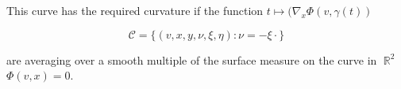\documentclass{article}
\theoremstyle{plain}
\theoremstyle{remark}
\theoremstyle{definition}
\DeclareMathOperator{\RR}{\mathbb{R}}
\begin{document}
This curve has the required curvature if the function $t \mapsto ( \nabla_x \Phi(v,\gamma(t))  $


%
%
%
%
%
%





%
% 
\[ \mathcal{C} = \Big\{ (v,x,y,\nu,\xi,\eta) : \nu = - \xi \cdot  \Big\} \]

are averaging over a smooth multiple of the surface measure on the curve in $\RR^2$ $\Phi(v,x) = 0$.
\end{document}
